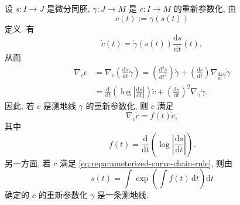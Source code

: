 \begin{description}[font=\normalfont,leftmargin=2em,labelwidth=1.5em]
设 $s:I\to J$ 是微分同胚, $\gamma:J\to M$ 是 $c:I\to M$ 的重新参数化, 由
\[
  c(t):=\gamma(s(t))
\]
定义. 有
\setcounter{equation}{28}
\begin{equation}\label{eq:reparameterized-curve-chain-rule}
  \dot c(t)=\dot\gamma(s(t))\frac{\mathrm{d}s}{\mathrm{d}t}(t),
\end{equation}
从而
\begin{align*}
  \nabla_{\dot c}\dot c
  &=\nabla_{\dot c}\left(\frac{\mathrm{d}s}{\mathrm{d}t}\dot\gamma\right)
    =\left(\frac{\mathrm{d}^2s}{\mathrm{d}t^2}\right)\dot\gamma
      +\left(\frac{\mathrm{d}s}{\mathrm{d}t}\right)
          \nabla_{\frac{\mathrm{d}s}{\mathrm{d}t}\dot\gamma}\dot\gamma\\
  &=\frac{\mathrm{d}}{\mathrm{d}t}\left(\log\left|\frac{\mathrm{d}s}{\mathrm{d}t}\right|\right)\dot c
      +\left(\frac{\mathrm{d}s}{\mathrm{d}t}\right)^2\nabla_{\dot\gamma}\dot\gamma.
\end{align*}
因此, 若 $c$ 是测地线 $\gamma$ 的重新参数化, 则 $c$ 满足
\[
  \nabla_{\dot c}\dot c=f(t)\dot c,
\]
其中
\[
  f(t)=\frac{\mathrm{d}}{\mathrm{d}t}\left(\log\left|\frac{\mathrm{d}s}{\mathrm{d}t}\right|\right).
\]
另一方面, 若 $c$ 满足 \eqref{eq:reparameterized-curve-chain-rule}, 则由
\[
  s(t)=\int\exp\left(\int f(t)\,\mathrm{d}t\right)\mathrm{d}t
\]
确定的 $c$ 的重新参数化 $\gamma$ 是一条测地线.


\end{description}
